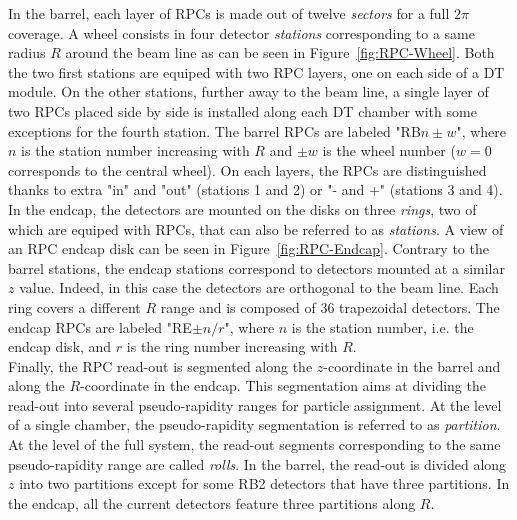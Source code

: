 	In the barrel, each layer of RPCs is made out of twelve \textit{sectors} for a full $2\pi$ coverage. A wheel consists in four detector \textit{stations} corresponding to a same radius $R$ around the beam line as can be seen in Figure~\ref{fig:RPC-Wheel}. Both the two first stations are equiped with two RPC layers, one on each side of a DT module. On the other stations, further away to the beam line, a single layer of two RPCs placed side by side is installed along each DT chamber with some exceptions for the fourth station. The barrel RPCs are labeled "RB$n \pm w$", where $n$ is the station number increasing with $R$ and $\pm w$ is the wheel number ($w = 0$ corresponds to the central wheel). On each layers, the RPCs are distinguished thanks to extra "in" and "out" (stations 1 and 2) or "- and +" (stations 3 and 4).\\
	In the endcap, the detectors are mounted on the disks on three \textit{rings}, two of which are equiped with RPCs, that can also be referred to as \textit{stations}. A view of an RPC endcap disk can be seen in Figure~\ref{fig:RPC-Endcap}. Contrary to the barrel stations, the endcap stations correspond to detectors mounted at a similar $z$ value. Indeed, in this case the detectors are orthogonal to the beam line. Each ring covers a different $R$ range and is composed of 36 trapezoidal detectors. The endcap RPCs are labeled "RE$\pm n/r$", where $n$ is the station number, i.e. the endcap disk, and $r$ is the ring number increasing with $R$.\\
	Finally, the RPC read-out is segmented along the $z$-coordinate in the barrel and along the $R$-coordinate in the endcap. This segmentation aims at dividing the read-out into several pseudo-rapidity ranges for particle assignment. At the level of a single chamber, the pseudo-rapidity segmentation is referred to as \textit{partition}. At the level of the full system, the read-out segments corresponding to the same pseudo-rapidity range are called \textit{rolls}. In the barrel, the read-out is divided along $z$ into two partitions except for some RB2 detectors that have three partitions. In the endcap, all the current detectors feature three partitions along $R$.
	
